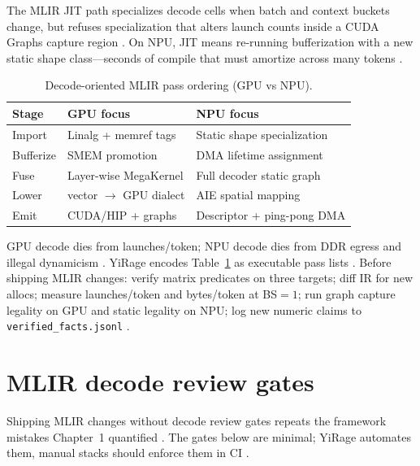 The MLIR JIT path specializes decode cells when batch and context buckets change, but refuses specialization that alters launch counts inside a CUDA Graphs capture region \citep{nvidia2024cudagraphs,taxbreak2026}. On NPU, JIT means re-running bufferization with a new static shape class---seconds of compile that must amortize across many tokens \citep{amd2024aie,patel2025llminference}.

\begin{table}[t]
\centering
\caption{Decode-oriented MLIR pass ordering (GPU vs NPU).}
\label{tab:mlir_pass_order}
\begin{tabular}{lll}
\toprule
\textbf{Stage} & \textbf{GPU focus} & \textbf{NPU focus} \\
\midrule
Import & Linalg + memref tags & Static shape specialization \\
Bufferize & SMEM promotion & DMA lifetime assignment \\
Fuse & Layer-wise MegaKernel & Full decoder static graph \\
Lower & vector $\rightarrow$ GPU dialect & AIE spatial mapping \\
Emit & CUDA/HIP + graphs & Descriptor + ping-pong DMA \\
\bottomrule
\end{tabular}
\end{table}

GPU decode dies from launches/token; NPU decode dies from DDR egress and illegal dynamicism \citep{taxbreak2026,liu2024deepseekv3,amd2024xdna}. YiRage encodes Table~\ref{tab:mlir_pass_order} as executable pass lists \citep{yirage2026}. Before shipping MLIR changes: verify matrix predicates on three targets; diff IR for new allocs; measure launches/token and bytes/token at BS${=}1$; run graph capture legality on GPU and static legality on NPU; log new numeric claims to \texttt{verified\_facts.jsonl} \citep{memoryfloor2026,kwon2023vllm,dao2022flashattention}.


\section{MLIR decode review gates}
\label{sec:ch14_review_gates}

Shipping MLIR changes without decode review gates repeats the framework mistakes Chapter~1 quantified \citep{taxbreak2026,memoryfloor2026}. The gates below are minimal; YiRage automates them, manual stacks should enforce them in CI \citep{yirage2026,patel2025llminference}.

